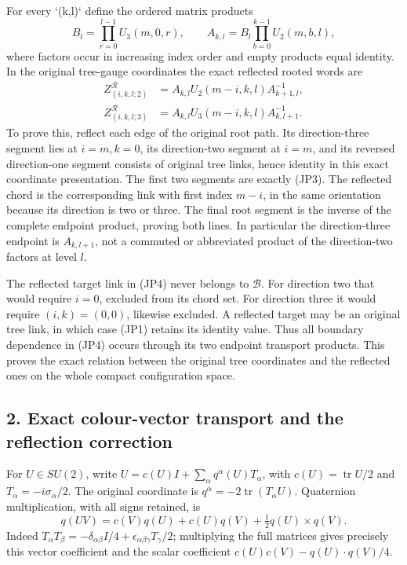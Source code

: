 \documentclass[11pt]{article}
\begin{document}
For every `(k,l)` define the ordered matrix products
\[
 B_l=\prod_{r=0}^{l-1}U_3(m,0,r),\qquad
 A_{k,l}=B_l\prod_{b=0}^{k-1}U_2(m,b,l),
\tag{JP3}
\]
where factors occur in increasing index order and empty products equal
identity. In the original tree-gauge coordinates the exact reflected
rooted words are
\[
\boxed{
\begin{aligned}
 Z^{\mathcal R}_{(i,k,l;2)}
    &=A_{k,l}U_2(m-i,k,l)A_{k+1,l}^{-1},\\
 Z^{\mathcal R}_{(i,k,l;3)}
    &=A_{k,l}U_3(m-i,k,l)A_{k,l+1}^{-1}.
\end{aligned}}\tag{JP4}
\]
To prove this, reflect each edge of the original root path. Its
direction-three segment lies at \(i=m,k=0\), its direction-two segment
at \(i=m\), and its reversed direction-one segment consists of original
tree links, hence identity in this exact coordinate presentation. The
first two segments are exactly (JP3). The reflected chord is the
corresponding link with first index \(m-i\), in the same orientation
because its direction is two or three. The final root segment is the
inverse of the complete endpoint product, proving both lines. In
particular the direction-three endpoint is \(A_{k,l+1}\), not a
commuted or abbreviated product of the direction-two factors at level
\(l\).

The reflected target link in (JP4) never belongs to \(\mathcal B\).
For direction two that would require \(i=0\), excluded from its chord
set. For direction three it would require \((i,k)=(0,0)\), likewise
excluded. A reflected target may be an original tree link, in which
case (JP1) retains its identity value. Thus all boundary dependence in
(JP4) occurs through its two endpoint transport products. This proves
the exact relation between the original tree coordinates and the
reflected ones on the whole compact configuration space.

\subsection*{2. Exact colour-vector transport and the reflection correction}

For \(U\in SU(2)\), write
\(U=c(U)I+\sum_\alpha q^\alpha(U)T_\alpha\), with
\(c(U)=\operatorname{tr}U/2\) and \(T_\alpha=-i\sigma_\alpha/2\).
The original coordinate is \(q^\alpha=-2\operatorname{tr}(T_\alpha U)\).
Quaternion multiplication, with all signs retained, is
\[
 q(UV)=c(V)q(U)+c(U)q(V)+\tfrac12q(U)\times q(V).
 \tag{JP5}
\]
Indeed \(T_\alpha T_\beta=-\delta_{\alpha\beta}I/4
+\epsilon_{\alpha\beta\gamma}T_\gamma/2\); multiplying the full
matrices gives precisely this vector coefficient and the scalar
coefficient \(c(U)c(V)-q(U)\cdot q(V)/4\).
\end{document}
